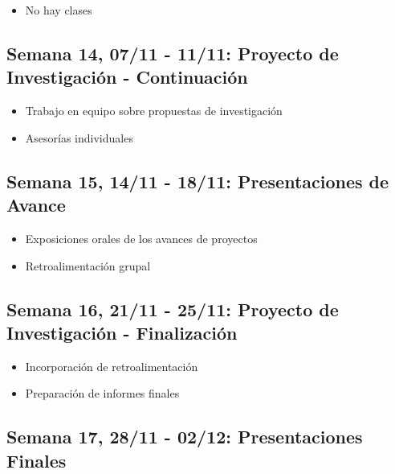 \documentclass[11pt,letter,]{article}
\providecommand{\tightlist}{%
  \setlength{\itemsep}{0pt}\setlength{\parskip}{0pt}}
\begin{document}
\begin{itemize}
\tightlist
\item
  No hay clases
\end{itemize}

\hypertarget{semana-14-0711---1111-proyecto-de-investigaciuxf3n---continuaciuxf3n}{%
\subsection{Semana 14, 07/11 - 11/11: Proyecto de Investigación -
Continuación}\label{semana-14-0711---1111-proyecto-de-investigaciuxf3n---continuaciuxf3n}}

\begin{itemize}
\tightlist
\item
  Trabajo en equipo sobre propuestas de investigación
\item
  Asesorías individuales
\end{itemize}

\hypertarget{semana-15-1411---1811-presentaciones-de-avance}{%
\subsection{Semana 15, 14/11 - 18/11: Presentaciones de
Avance}\label{semana-15-1411---1811-presentaciones-de-avance}}

\begin{itemize}
\tightlist
\item
  Exposiciones orales de los avances de proyectos
\item
  Retroalimentación grupal
\end{itemize}

\hypertarget{semana-16-2111---2511-proyecto-de-investigaciuxf3n---finalizaciuxf3n}{%
\subsection{Semana 16, 21/11 - 25/11: Proyecto de Investigación -
Finalización}\label{semana-16-2111---2511-proyecto-de-investigaciuxf3n---finalizaciuxf3n}}

\begin{itemize}
\tightlist
\item
  Incorporación de retroalimentación
\item
  Preparación de informes finales
\end{itemize}

\hypertarget{semana-17-2811---0212-presentaciones-finales}{%
\subsection{Semana 17, 28/11 - 02/12: Presentaciones
Finales}\label{semana-17-2811---0212-presentaciones-finales}}
\end{document}

